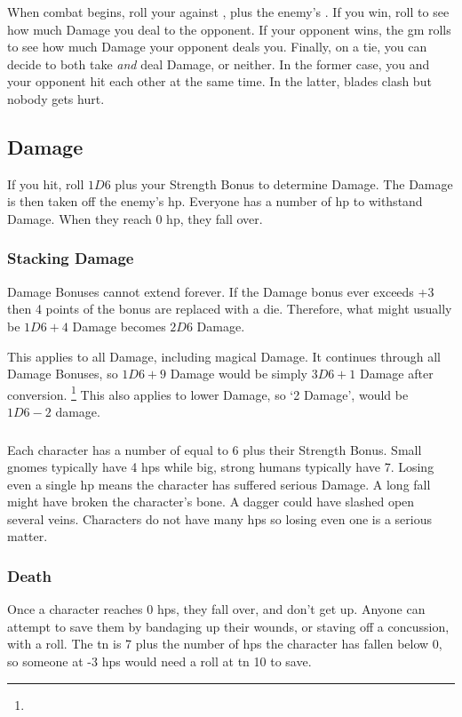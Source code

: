 \begin{multicols}{2}
When combat begins, roll your  against \tn[7], plus the enemy's .
If you win, roll to see how much Damage you deal to the opponent.
If your opponent wins, the \gls{gm} rolls to see how much Damage your opponent deals you.
Finally, on a tie, you can decide to both take \emph{and} deal Damage, or neither.
In the former case, you and your opponent hit each other at the same time.
In the latter, blades clash but nobody gets hurt.

\subsection{Damage}

If you hit, roll $1D6$ plus your Strength Bonus to determine Damage.
The Damage is then taken off the enemy's \gls{hp}.
Everyone has a number of \gls{hp} to withstand Damage.
When they reach 0 \gls{hp}, they fall over.

\subsubsection{Stacking Damage}
\label{stackingDamage}

Damage Bonuses cannot extend forever.
If the Damage bonus ever exceeds +3 then 4 points of the bonus are replaced with a die.
Therefore, what might usually be $1D6+4$ Damage becomes $2D6$ Damage.

This applies to all Damage, including magical Damage.
It continues through all Damage Bonuses, so $1D6+9$ Damage would be simply $3D6+1$ Damage after conversion.%
\footnote{\stackingDamageChart}
This also applies to lower Damage, so `2 Damage', would be $1D6-2$ damage.

\subsubsection{}

Each character has a number of  equal to 6 plus their Strength Bonus.
Small gnomes typically have 4 \glspl{hp} while big, strong humans typically have 7.
Losing even a single \gls{hp} means the character has suffered serious Damage.
A long fall might have broken the character's bone.
A dagger could have slashed open several veins.
Characters do not have many \glspl{hp} so losing even one is a serious matter.

\subsubsection{Death}
\label{death}
Once a character reaches 0 \glspl{hp}, they fall over, and don't get up.
Anyone can attempt to save them by bandaging up their wounds, or staving off a concussion, with a  roll.
The \gls{tn} is 7 plus the number of \glspl{hp} the character has fallen below 0, so someone at -3 \glspl{hp} would need a roll at \gls{tn} 10 to save.


\end{multicols}
